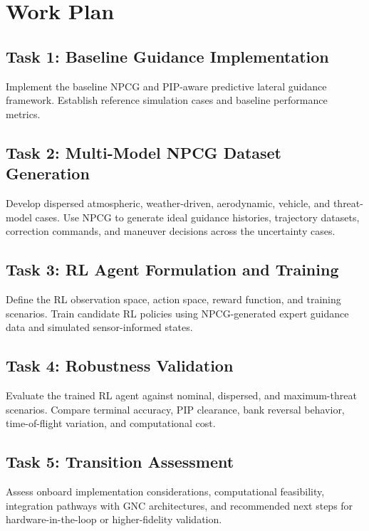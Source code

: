 \section{Work Plan}

\subsection{Task 1: Baseline Guidance Implementation}

Implement the baseline NPCG and PIP-aware predictive lateral guidance framework. Establish reference simulation cases and baseline performance metrics.

\subsection{Task 2: Multi-Model NPCG Dataset Generation}

Develop dispersed atmospheric, weather-driven, aerodynamic, vehicle, and threat-model cases. Use NPCG to generate ideal guidance histories, trajectory datasets, correction commands, and maneuver decisions across the uncertainty cases.

\subsection{Task 3: RL Agent Formulation and Training}

Define the RL observation space, action space, reward function, and training scenarios. Train candidate RL policies using NPCG-generated expert guidance data and simulated sensor-informed states.

\subsection{Task 4: Robustness Validation}

Evaluate the trained RL agent against nominal, dispersed, and maximum-threat scenarios. Compare terminal accuracy, PIP clearance, bank reversal behavior, time-of-flight variation, and computational cost.

\subsection{Task 5: Transition Assessment}

Assess onboard implementation considerations, computational feasibility, integration pathways with GNC architectures, and recommended next steps for hardware-in-the-loop or higher-fidelity validation.
